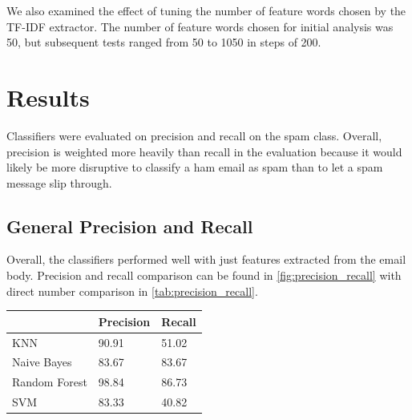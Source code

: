 \documentclass[12pt]{article}
\newenvironment{Figure}
  {\par\medskip\noindent\minipage{\linewidth}}
  {\endminipage\par\medskip}
\begin{document}
\begin{multicols}{2}
            We also examined the effect of tuning the number of feature words chosen by the TF-IDF 
            extractor. The number of feature words chosen for initial analysis was 50, but subsequent 
            tests ranged from 50 to 1050 in steps of 200.
        \section{Results}
            Classifiers were evaluated on precision and recall on the spam class. Overall, precision is
            weighted more heavily than recall in the evaluation because it would likely be more disruptive 
            to classify a ham email as spam than to let a spam message slip through.
            \subsection{General Precision and Recall}
                Overall, the classifiers performed well with just features extracted from the email body.
                Precision and recall comparison can be found in \autoref{fig:precision_recall} with direct 
                number comparison in \autoref{tab:precision_recall}. 

                \begin{Figure}
                    \begin{tabular}{|l|l|l|}
                    \hline
                                  & Precision & Recall \\ \hline
                    KNN           & 90.91     & 51.02  \\ \hline
                    Naive Bayes   & 83.67     & 83.67  \\ \hline
                    Random Forest & 98.84     & 86.73  \\ \hline
                    SVM           & 83.33     & 40.82  \\ \hline
                    \end{tabular}
                    \label{tab:precision_recall}
                \end{Figure}


\end{multicols}
\end{document}
